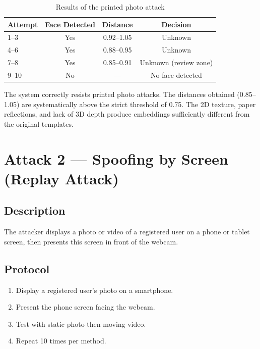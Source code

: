 \begin{table}[H]
    \centering
    \begin{tabular}{lccc}
        \toprule
        \textbf{Attempt} & \textbf{Face Detected} & \textbf{Distance} & \textbf{Decision} \\
        \midrule
        1--3   & Yes & 0.92--1.05 & Unknown \\
        4--6   & Yes & 0.88--0.95 & Unknown \\
        7--8   & Yes & 0.85--0.91 & Unknown (review zone) \\
        9--10  & No  & ---        & No face detected \\
        \bottomrule
    \end{tabular}
    \caption{Results of the printed photo attack}
\end{table}

\begin{successbox}[Analysis]
The system correctly resists printed photo attacks. The distances obtained (0.85--1.05) are systematically above the strict threshold of 0.75. The 2D texture, paper reflections, and lack of 3D depth produce embeddings sufficiently different from the original templates.
\end{successbox}


\section{Attack 2 — Spoofing by Screen (Replay Attack)}

\subsection{Description}

The attacker displays a photo or video of a registered user on a phone or tablet screen, then presents this screen in front of the webcam.

\subsection{Protocol}

\begin{enumerate}
    \item Display a registered user's photo on a smartphone.
    \item Present the phone screen facing the webcam.
    \item Test with static photo then moving video.
    \item Repeat 10 times per method.
\end{enumerate}

